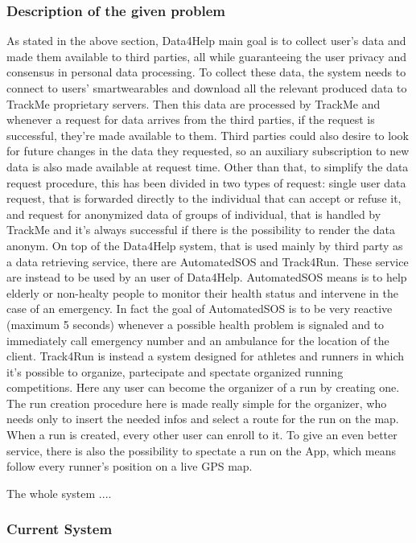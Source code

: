 \subsubsection{Description of the given problem}
As stated in the above section, Data4Help main goal is to collect user's data and made them available to third parties, all while guaranteeing the user privacy and consensus in personal data processing. To collect these data, the system needs to connect to users' smartwearables and download all the relevant produced data to TrackMe proprietary servers. Then this data are processed by TrackMe and whenever a request for data arrives from the third parties, if the request is successful, they're made available to them. Third parties could also desire to look for future changes in the data they requested, so an auxiliary subscription to new data is also made available at request time. Other than that, to simplify the data request procedure, this has been divided in two types of request: single user data request, that is forwarded directly to the individual that can accept or refuse it, and request for anonymized data of groups of individual, that is handled by TrackMe and it's always successful if there is the possibility to render the data anonym.
On top of the Data4Help system, that is used mainly by third party as a data retrieving service, there are AutomatedSOS and Track4Run. These service are instead to be used by an user of Data4Help. AutomatedSOS means is to help elderly or non-healty people to monitor their health status and intervene in the case of an emergency. In fact the goal of AutomatedSOS is to be very reactive (maximum 5 seconds) whenever a possible health problem is signaled and to immediately call emergency number and an ambulance for the location of the client.
Track4Run is instead a system designed for athletes and runners in which it's possible to organize, partecipate and spectate organized running competitions. Here any user can become the organizer of a run by creating one. The run creation procedure here is made really simple for the organizer, who needs only to insert the needed infos and select a route for the run on the map. When a run is created, every other user can enroll to it. To give an even better service, there is also the possibility to spectate a run on the App, which means follow every runner's position on a live GPS map.

The whole system ....
\subsubsection{Current System}

